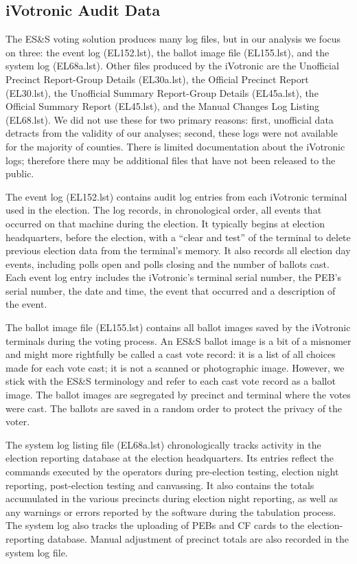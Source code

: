 \documentclass[letterpaper,twocolumn,10pt]{article}
\begin{document}

\subsection{iVotronic Audit Data}
The ES\&S voting solution produces many log files, but in our analysis we focus
on three: the event log (EL152.lst), the ballot image file (EL155.lst), and the
system log (EL68a.lst). Other files produced by the iVotronic are the Unofficial Precinct Report-Group
Details (EL30a.lst), the Official Precinct Report (EL30.lst), the Unofficial Summary 
Report-Group Details (EL45a.lst), the Official Summary Report (EL45.lst), and the 
Manual Changes Log Listing (EL68.lst). We did not use these for two primary reasons: 
first, unofficial data detracts from the validity of our analyses; second, these 
logs were not available for the majority of counties. There is limited documentation 
about the iVotronic logs; therefore there may be additional files 
that have not been released to the public.

The event log (EL152.lst) contains audit
log entries from each iVotronic terminal used in the election. The log records,
in chronological order, all events that occurred on that machine during the
election. It typically begins at election headquarters, before the election, 
with a \textquotedblleft clear and test\textquotedblright \hspace{1 mm} of the 
terminal to delete previous election data from the terminal's memory.  It also 
records all election day events, including polls open and polls closing and 
the number of ballots cast. Each event log entry includes the iVotronic's 
terminal serial number, the PEB's serial number, the date and time, the event 
that occurred and a description of the event.

The ballot image file (EL155.lst) 
contains all ballot images saved by the iVotronic terminals during the voting
process. An ES\&S ballot image is a bit of a misnomer and might more rightfully
be called a cast vote record: it is a list of all choices made for each vote 
cast; it is not a scanned or photographic image. However, we stick with the
ES\&S terminology and refer to each cast vote record as a ballot image. The ballot images are 
segregated by precinct and terminal where the votes were cast. The ballots are 
saved in a random order to protect the privacy of the voter.

The system log listing file (EL68a.lst) chronologically tracks activity in the
election reporting database at the election headquarters. Its entries reflect 
the commands executed by the operators during pre-election testing, election 
night reporting, post-election testing and canvassing.  It also contains the totals
accumulated in the various precincts during election night reporting, as well as
any warnings or errors reported by the software during the tabulation
process. The system log also tracks the uploading of PEBs and CF cards to the
election-reporting database. Manual adjustment of precinct totals are also recorded 
in the system log file.
\end{document}
